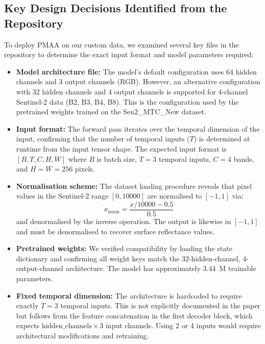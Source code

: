 \documentclass[12pt,a4paper]{article}
\begin{document}
\subsection{Key Design Decisions Identified from the Repository}

To deploy PMAA on our custom data, we examined several key files in the repository to determine the exact input format and model parameters required:

\begin{itemize}[leftmargin=2em]
    \item \textbf{Model architecture file:} The model's default configuration uses 64 hidden channels and 3 output channels (RGB). However, an alternative configuration with 32 hidden channels and 4 output channels is supported for 4-channel Sentinel-2 data (B2, B3, B4, B8). This is the configuration used by the pretrained weights trained on the Sen2\_MTC\_New dataset.
    
    \item \textbf{Input format:} The forward pass iterates over the temporal dimension of the input, confirming that the number of temporal inputs ($T$) is determined at runtime from the input tensor shape. The expected input format is $[B, T, C, H, W]$ where $B$ is batch size, $T=3$ temporal inputs, $C=4$ bands, and $H=W=256$ pixels.
    
    \item \textbf{Normalisation scheme:} The dataset loading procedure reveals that pixel values in the Sentinel-2 range $[0, 10000]$ are normalised to $[-1, 1]$ via:
    \begin{equation}
        x_{\text{norm}} = \frac{x / 10000 - 0.5}{0.5}
    \end{equation}
    and denormalised by the inverse operation. The output is likewise in $[-1, 1]$ and must be denormalised to recover surface reflectance values.
    
    \item \textbf{Pretrained weights:} We verified compatibility by loading the state dictionary and confirming all weight keys match the 32-hidden-channel, 4-output-channel architecture. The model has approximately 3.44~M trainable parameters.
    
    \item \textbf{Fixed temporal dimension:} The architecture is hardcoded to require exactly $T=3$ temporal inputs. This is not explicitly documented in the paper but follows from the feature concatenation in the first decoder block, which expects $\text{hidden\_channels} \times 3$ input channels. Using 2 or 4 inputs would require architectural modifications and retraining.
\end{itemize}
\end{document}
